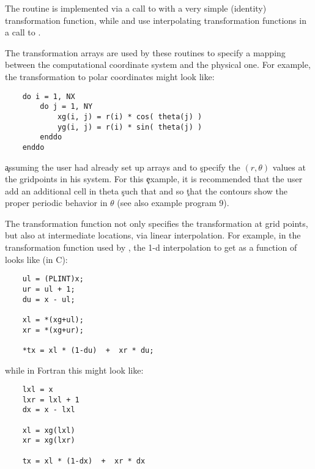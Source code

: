 
The  routine is implemented via a call to 
with a very simple (identity) transformation function, while
 and  use interpolating transformation
functions in a call to .

The transformation arrays are used by these routines to specify a
mapping between the computational coordinate system and the physical
one.  For example, the transformation to polar coordinates might look
like:

\begin{verbatim}
    do i = 1, NX
        do j = 1, NY
            xg(i, j) = r(i) * cos( theta(j) )
            yg(i, j) = r(i) * sin( theta(j) )
        enddo
    enddo
\end{verbatim}

\c assuming the user had already set up arrays  and  to
\c specify the $(r, \theta)$ values at the gridpoints in his system.  For this
\c example, it is recommended that the user add an additional cell in theta
\c such that  and  so
\c that the contours show the proper periodic behavior in $\theta$ (see also
example program 9).

The transformation function not only specifies the transformation at grid
points, but also at intermediate locations, via linear interpolation.  For
example, in the  transformation function used by , 
the 1-d interpolation to get  as a function of  
looks like (in C):

\begin{verbatim}
    ul = (PLINT)x;
    ur = ul + 1;
    du = x - ul;

    xl = *(xg+ul);
    xr = *(xg+ur);

    *tx = xl * (1-du)  +  xr * du;
\end{verbatim}

while in Fortran this might look like:

\begin{verbatim}
    lxl = x
    lxr = lxl + 1
    dx = x - lxl

    xl = xg(lxl)
    xr = xg(lxr)

    tx = xl * (1-dx)  +  xr * dx
\end{verbatim}
